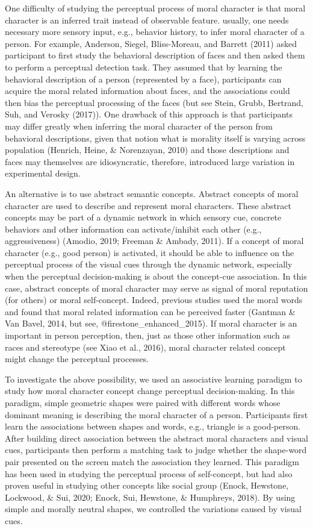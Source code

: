 \documentclass[
  english,
  man]{apa6}
\begin{document}
One difficulty of studying the perceptual process of moral character is that moral character is an inferred trait instead of observable feature. usually, one needs necessary more sensory input, e.g., behavior history, to infer moral character of a person. For example, Anderson, Siegel, Bliss-Moreau, and Barrett (2011) asked participant to first study the behavioral description of faces and then asked them to perform a perceptual detection task. They assumed that by learning the behavioral description of a person (represented by a face), participants can acquire the moral related information about faces, and the associations could then bias the perceptual processing of the faces (but see Stein, Grubb, Bertrand, Suh, and Verosky (2017)). One drawback of this approach is that participants may differ greatly when inferring the moral character of the person from behavioral descriptions, given that notion what is morality itself is varying across population (Henrich, Heine, \& Norenzayan, 2010) and those descriptions and faces may themselves are idiosyncratic, therefore, introduced large variation in experimental design.

An alternative is to use abstract semantic concepts. Abstract concepts of moral character are used to describe and represent moral characters. These abstract concepts may be part of a dynamic network in which sensory cue, concrete behaviors and other information can activate/inhibit each other (e.g., aggressiveness) (Amodio, 2019; Freeman \& Ambady, 2011). If a concept of moral character (e.g., good person) is activated, it should be able to influence on the perceptual process of the visual cues through the dynamic network, especially when the perceptual decision-making is about the concept-cue association. In this case, abstract concepts of moral character may serve as signal of moral reputation (for others) or moral self-concept. Indeed, previous studies used the moral words and found that moral related information can be perceived faster (Gantman \& Van Bavel, 2014, but see, @firestone\_enhanced\_2015). If moral character is an important in person perception, then, just as those other information such as races and stereotype (see Xiao et al., 2016), moral character related concept might change the perceptual processes.

To investigate the above possibility, we used an associative learning paradigm to study how moral character concept change perceptual decision-making. In this paradigm, simple geometric shapes were paired with different words whose dominant meaning is describing the moral character of a person. Participants first learn the associations between shapes and words, e.g., triangle is a good-person. After building direct association between the abstract moral characters and visual cues, participants then perform a matching task to judge whether the shape-word pair presented on the screen match the association they learned. This paradigm has been used in studying the perceptual process of self-concept, but had also proven useful in studying other concepts like social group (Enock, Hewstone, Lockwood, \& Sui, 2020; Enock, Sui, Hewstone, \& Humphreys, 2018). By using simple and morally neutral shapes, we controlled the variations caused by visual cues.
\end{document}
